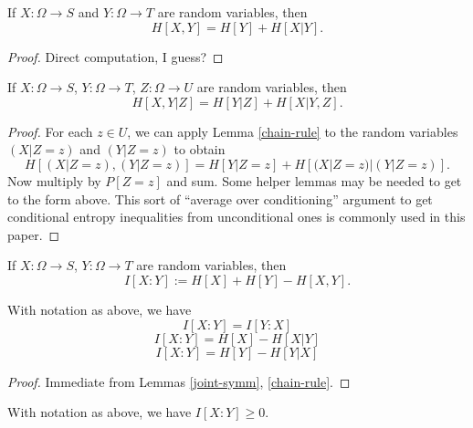 \begin{lemma}\label{chain-rule}
   
  If $X: \Omega \to S$ and $Y: \Omega \to T$ are random variables, then
  $$ H[ X,Y  ] = H[Y] + H[X|Y].$$
\end{lemma}

\begin{proof} Direct computation, I guess?
\end{proof}

\begin{lemma}\label{conditional-chain-rule} 
  If $X: \Omega \to S$, $Y: \Omega \to T$, $Z: \Omega \to U$ are random variables, then
$$ H[  X,Y | Z ] = H[Y | Z] + H[X|Y, Z].$$
\end{lemma}

\begin{proof}  For each $z \in U$, we can apply Lemma \ref{chain-rule} to the random variables $(X|Z=z)$ and $(Y|Z=z)$ to obtain
$$ H[ (X|Z=z),(Y|Z=z) ] = H[Y|Z=z] + H[(X|Z=z)|(Y|Z=z)].$$
Now multiply by $P[Z=z]$ and sum.  Some helper lemmas may be needed to get to the form above.  This sort of ``average over conditioning'' argument to get conditional entropy inequalities from unconditional ones is commonly used in this paper.
\end{proof}

\begin{definition}\label{information-def} If $X: \Omega \to S$, $Y: \Omega \to T$ are random variables, then
  $$ I[ X : Y ] := H[X] + H[Y] - H[X,Y].$$
\end{definition}

\begin{lemma}\label{alternative-mutual}
    
  With notation as above, we have
$$  I[X : Y] = I[Y:X]$$
$$  I[X : Y] = H[X] - H[X|Y]$$
$$  I[X : Y] = H[Y] - H[Y|X]$$
\end{lemma}

\begin{proof} Immediate from Lemmas \ref{joint-symm}, \ref{chain-rule}.
\end{proof}

\begin{lemma}\label{mutual-nonneg}  With notation as above, we have $I[X:Y] \geq 0$.
\end{lemma}

